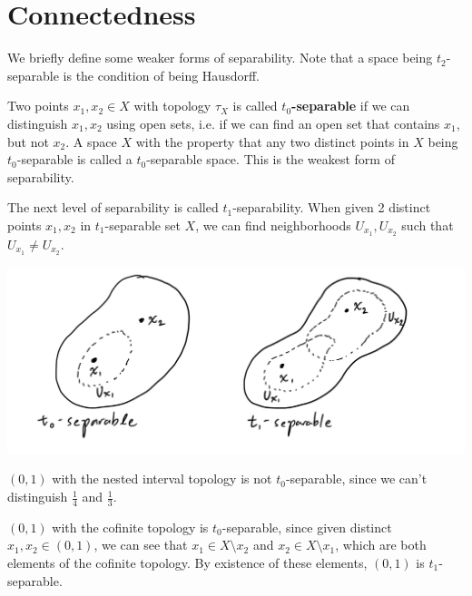 \section{Connectedness} 

    We briefly define some weaker forms of separability. Note that a space being $t_2$-separable is the condition of being Hausdorff. 

    \begin{definition}[$t_0, t_1$-Separability]
      Two points $x_1, x_2 \in X$ with topology $\tau_{X}$ is called $t_0$\textbf{-separable} if we can distinguish $x_1, x_2$ using open sets, i.e. if we can find an open set that contains $x_1$, but not $x_2$. A space $X$ with the property that any two distinct points in $X$ being $t_0$-separable is called a $t_0$-separable space. This is the weakest form of separability. 

      The next level of separability is called $t_1$-separability. When given 2 distinct points $x_1, x_2$ in $t_1$-separable set $X$, we can find neighborhoods $U_{x_1}, U_{x_2}$ such that $U_{x_1} \neq U_{x_2}$. 
      \begin{center}
        \includegraphics[scale=0.25]{img/t0_t1_Separability.PNG}
      \end{center}
    \end{definition}

    \begin{example}
      $(0,1)$ with the nested interval topology is not $t_0$-separable, since we can't distinguish $\frac{1}{4}$ and $\frac{1}{3}$.
    \end{example}

    \begin{example}
      $(0,1)$ with the cofinite topology is $t_0$-separable, since given distinct $x_1, x_2 \in (0,1)$, we can see that $x_1 \in X \setminus {x_2}$ and $x_2 \in X \setminus {x_1}$, which are both elements of the cofinite topology. By existence of these elements, $(0,1)$ is $t_1$-separable. 
    \end{example}

